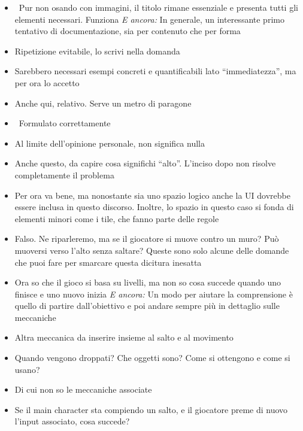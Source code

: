 {\small
\begin{itemize}
  \item {} \rvBene\ Pur non osando con immagini, il titolo rimane essenziale e presenta tutti gli elementi necessari. Funziona \emph{E ancora:} In generale, un interessante primo tentativo di documentazione, sia per contenuto che per forma
  \item {} Ripetizione evitabile, lo scrivi nella domanda
  \item {} Sarebbero necessari esempi concreti e quantificabili lato ``immediatezza'', ma per ora lo accetto
  \item {} Anche qui, relativo. Serve un metro di paragone
  \item {} \rvBene\ Formulato correttamente
  \item {} Al limite dell'opinione personale, non significa nulla
  \item {} Anche questo, da capire cosa significhi ``alto''. L'inciso dopo non risolve completamente il problema
  \item {} Per ora va bene, ma nonostante sia uno spazio logico anche la UI dovrebbe essere inclusa in questo discorso. Inoltre, lo spazio in questo caso si fonda di elementi minori come i tile, che fanno parte delle regole
  \item {} Falso. Ne riparleremo, ma se il giocatore si muove contro un muro? Può muoversi verso l'alto senza saltare? Queste sono solo alcune delle domande che puoi fare per smarcare questa dicitura inesatta
  \item {} Ora so che il gioco si basa su livelli, ma non so cosa succede quando uno finisce e uno nuovo inizia \emph{E ancora:} Un modo per aiutare la comprensione è quello di partire dall'obiettivo e poi andare sempre più in dettaglio sulle meccaniche
  \item {} Altra meccanica da inserire insieme al salto e al movimento
  \item {} Quando vengono droppati? Che oggetti sono? Come si ottengono e come si usano?
  \item {} Di cui non so le meccaniche associate
  \item {} Se il main character sta compiendo un salto, e il giocatore preme di nuovo l'input associato, cosa succede?

\end{itemize}}
